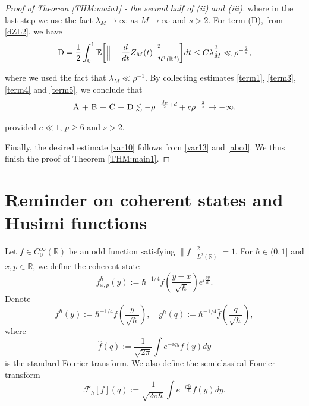 \documentclass[%
11pt,  reqno]{amsart}
\theoremstyle{remarkstyle}
\newcommand{\1}{\hspace{0.2mm}\text{I}\hspace{0.2mm}}
\newcommand{\noi}{\noindent}
\newcommand{\R}{\mathbb{R}}
\newcommand{\E}{\mathbb{E}}
\newcommand{\ld}{\lambda}
\newcommand{\les}{\lesssim}
\renewcommand{\H}{\mathcal{H}}
\numberwithin{equation}{section}
\numberwithin{theorem}{section}
\begin{document}
\begin{proof}[Proof of Theorem \ref{THM:main1} - the second half of \textup{(ii) $and$ (iii)}]
		\noi
		where in the last step we use the fact $\ld_M \to \infty$ as $M\to \infty$ and $s > 2$.
		For term (D),
		from \eqref{dZL2},
		we have
		\begin{align}
			\label{term5}
			\begin{split}
				\textup{D}  = \frac12 \int_0^1 \E \bigg[  \Big\| -  \frac{d}{dt} Z_M (t) \Big\|_{\H^1  (\R^d)}^2 \bigg] dt  \le C \ld_M^{\frac2s} \ll \rho^{-\frac2s},
			\end{split}
		\end{align}
		
		\noi 
		where we used the fact that $\ld_M \ll \rho^{-1}$.
		By collecting estimates  \eqref{term1}, \eqref{term3}, \eqref{term4} and \eqref{term5},
		we conclude that 
		\begin{align}
			\label{abcd}
			\textup{A + B + C + D} \les - \rho^{-\frac{dp}2 +d} + c \rho^{-\frac2s}  \to - \infty,
		\end{align}
		
		\noi
		provided $c\ll 1$, $p \ge 6$ and $s > 2$.
		
		Finally,
		the desired estimate \eqref{var10} follows from \eqref{var13} and \eqref{abcd}.
		We thus finish the proof of Theorem \ref{THM:main1}.
	\end{proof}
	
	\newpage
	
	
	\appendix
	
	\section{Reminder on coherent states and Husimi functions}
	\label{SEC:Weyl}
	
	Let $f \in C^\infty_0(\R)$ be an odd function satisfying $\|f\|^2_{L^2(\R)}=1$. For $\hbar\in (0,1]$ and $x, p \in \R$, we define the coherent state
	\[
	f^{\hbar}_{x,p}(y) := \hbar^{-1/4} f\left(\frac{y-x}{\sqrt{\hbar}}\right) e^{i\frac{py}{\hbar}}.
	\]
	Denote
	\[
	f^\hbar(y) := \hbar^{-1/4} f\left(\frac{y}{\sqrt{\hbar}}\right), \quad g^\hbar(q) := \hbar^{-1/4} \hat{f}\left(\frac{q}{\sqrt{\hbar}}\right),
	\]
	where 
	\[
	\hat{f}(q):= \frac{1}{\sqrt{2\pi}} \int e^{-i q y} f(y) dy
	\]
	is the standard Fourier transform. We also define the semiclassical Fourier transform
	\[
	\mathcal F_{\hbar}[f](q) :=\frac{1}{\sqrt{2\pi \hbar}} \int e^{-i\frac{qy}{\hbar}} f(y) dy.
	\]
	
\end{document}
